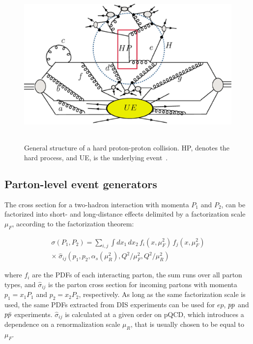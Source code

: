 \begin{figure}[!ht]
  \begin{center}
    \mbox{
        \includegraphics[width=0.995\textwidth]{StandardModel/Figures/HardInteractionEvolution.eps}
    }
  \end{center}
  \caption[General structure of a hard proton-proton collision.]{General structure of a hard proton-proton collision. HP, denotes the hard process, and UE, is the underlying event~\protect\cite{Mangano:2005dj}.}
  \label{fig:HardCollisionEvolution}
\end{figure}


\subsection{Parton-level event generators}
    \label{subsec:EventGenerators}

The cross section for a two-hadron interaction with momenta $P_1$ and $P_2$, can be factorized into short- and long-distance effects delimited by a factorization scale $\mu_F$, according to the factorization theorem:

\begin{equation}
\begin{split}
\sigma(P_1, P_2) = \sum_{i, j} \int dx_1\, dx_2\, f_i(x, \mu_F^2)\, f_j(x, \mu_F^2) \\
  \times\; \hat{\sigma}_{ij}(p_1, p_2, \alpha_s(\mu_R^2), Q^2/\mu_F^2,  Q^2/\mu_R^2) 
\end{split}
\label{eqXSecQCDComputation}
\end{equation}

\noindent where $f_i$ are the PDFs of each interacting parton, the sum runs over all parton types, and $\hat{\sigma}_{ij}$ is the parton cross section for incoming partons with momenta $p_1=x_1P_1$ and $p_2=x_2P_2$, respectively.
As long as the same factorization scale is used, the same PDFs extracted from DIS experiments can be used for $ep$, $pp$ and $p\bar{p}$ experiments.
$\hat{\sigma}_{ij}$ is calculated at a given order on pQCD, which introduces a dependence on a renormalization scale $\mu_R$, that is usually chosen to be equal to $\mu_F$.

